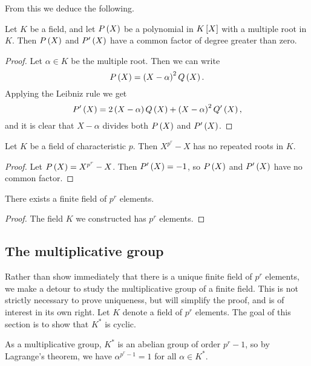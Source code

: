 From this we deduce the following.

\begin{lemma}
Let $ K $ be a field, and let $ P\rb{X} $ be a polynomial in $ K\sb{X} $ with a multiple root in $ K $. Then $ P\rb{X} $ and $ P'\rb{X} $ have a common factor of degree greater than zero.
\end{lemma}

\begin{proof}
Let $ \alpha \in K $ be the multiple root. Then we can write
$$ P\rb{X} = \rb{X - \alpha}^2Q\rb{X}. $$
Applying the Leibniz rule we get
$$ P'\rb{X} = 2\rb{X - \alpha}Q\rb{X} + \rb{X - \alpha}^2Q'\rb{X}, $$
and it is clear that $ X - \alpha $ divides both $ P\rb{X} $ and $ P'\rb{X} $.
\end{proof}

\begin{corollary}
Let $ K $ be a field of characteristic $ p $. Then $ X^{p^r} - X $ has no repeated roots in $ K $.
\end{corollary}

\begin{proof}
Let $ P\rb{X} = X^{p^r} - X $. Then $ P'\rb{X} = -1 $, so $ P\rb{X} $ and $ P'\rb{X} $ have no common factor.
\end{proof}

\begin{corollary}
There exists a finite field of $ p^r $ elements.
\end{corollary}

\begin{proof}
The field $ K $ we constructed has $ p^r $ elements.
\end{proof}

\pagebreak

\subsection{The multiplicative group}


Rather than show immediately that there is a unique finite field of $ p^r $ elements, we make a detour to study the multiplicative group of a finite field. This is not strictly necessary to prove uniqueness, but will simplify the proof, and is of interest in its own right. Let $ K $ denote a field of $ p^r $ elements. The goal of this section is to show that $ K^* $ is cyclic.

\begin{note*}
As a multiplicative group, $ K^* $ is an abelian group of order $ p^r - 1 $, so by Lagrange's theorem, we have $ \alpha^{p^r - 1} = 1 $ for all $ \alpha \in K^* $.
\end{note*}

